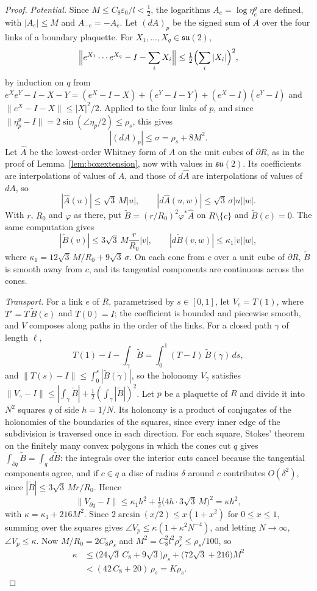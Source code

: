 \documentclass[11pt]{amsart}
\theoremstyle{definition}
\theoremstyle{remark}
\numberwithin{equation}{section}
\begin{document}
\begin{proof}
\emph{Potential.} Since $M\le C_8\varepsilon_0/l<\frac12$, the logarithms
$A_e=\log\eta^g_e$ are defined, with $|A_e|\le M$ and $A_{-e}=-A_e$. Let
$(dA)_p$ be the signed sum of $A$ over the four links of a boundary
plaquette. For $X_1,\dots,X_q\in\mathfrak{su}(2)$,
\[
\Bigl\lVert e^{X_1}\cdots e^{X_q}-I-\sum_iX_i\Bigr\rVert\le\tfrac12\Bigl(
\sum_i|X_i|\Bigr)^2 ,
\]
by induction on $q$ from $e^Xe^Y-I-X-Y=(e^X-I-X)+(e^Y-I-Y)+(e^X-I)(e^Y-I)$
and $\lVert e^X-I-X\rVert\le|X|^2/2$. Applied to the four links of $p$, and
since $\lVert\eta^g_p-I\rVert=2\sin(\angle\eta_p/2)\le\rho_s$, this gives
\[
|(dA)_p|\le\sigma=\rho_s+8M^2 .
\]
Let $\hat A$ be the lowest-order Whitney form of $A$ on the unit cubes of
$\partial R$, as in the proof of Lemma~\ref{lem:boxextension}, now with
values in $\mathfrak{su}(2)$. Its coefficients are interpolations of values
of $A$, and those of $d\hat A$ are interpolations of values of $dA$, so
\[
|\hat A(u)|\le\sqrt3\,M|u|,\qquad|d\hat A(u,w)|\le\sqrt3\,\sigma|u||w| .
\]
With $r$, $R_0$ and $\varphi$ as there, put $\tilde B=(r/R_0)^2\varphi^*
\hat A$ on $R\setminus\{c\}$ and $\tilde B(c)=0$. The same computation
gives
\[
|\tilde B(v)|\le3\sqrt3\,M\frac r{R_0}|v|,\qquad|d\tilde B(v,w)|\le\kappa_1
|v||w|,
\]
where $\kappa_1=12\sqrt3\,M/R_0+9\sqrt3\,\sigma$.
On each cone from $c$ over a unit cube of $\partial R$, $\tilde B$ is
smooth away from $c$, and its tangential components are continuous across
the cones.

\emph{Transport.} For a link $e$ of $R$, parametrised by $s\in[0,1]$, let
$V_e=T(1)$, where $T'=T\,\tilde B(\dot e)$ and $T(0)=I$; the coefficient is
bounded and piecewise smooth, and $V$ composes along paths in the order of
the links. For a closed path $\gamma$ of length $\ell$,
\[
T(1)-I-\int_\gamma\tilde B=\int_0^1(T-I)\,\tilde B(\dot\gamma)\,ds,
\]
and $\lVert T(s)-I\rVert\le\int_0^s|\tilde B(\dot\gamma)|$,
so the holonomy $V_\gamma$ satisfies $\lVert V_\gamma-I\rVert\le|\int_\gamma
\tilde B|+\frac12(\int_\gamma|\tilde B|)^2$. Let $p$ be a plaquette of $R$
and divide it into $N^2$ squares $q$ of side $h=1/N$. Its holonomy is a
product of conjugates of the holonomies of the boundaries of the squares,
since every inner edge of the subdivision is traversed once in each
direction. For each square, Stokes' theorem on the finitely many convex
polygons in which the cones cut $q$ gives $\int_{\partial q}\tilde B=
\int_qd\tilde B$: the integrals over the interior cuts cancel because the
tangential components agree, and if $c\in q$ a disc of radius $\delta$
around $c$ contributes $O(\delta^2)$, since $|\tilde B|\le3\sqrt3\,Mr/R_0$.
Hence
\[
\lVert V_{\partial q}-I\rVert\le\kappa_1h^2+\tfrac12\bigl(4h\cdot3\sqrt3\,M
\bigr)^2=\kappa h^2,
\]
with $\kappa=\kappa_1+216M^2$.
Since $2\arcsin(x/2)\le x(1+x^2)$ for $0\le x\le1$, summing over the
squares gives $\angle V_p\le\kappa(1+\kappa^2N^{-4})$, and letting
$N\to\infty$, $\angle V_p\le\kappa$. Now $M/R_0=2C_8\rho_s$ and
$M^2=C_8^2l^2\rho_s^2\le\rho_s/100$, so
\[
\begin{split}
\kappa&\le\bigl(24\sqrt3\,C_8+9\sqrt3\bigr)\rho_s+\bigl(72\sqrt3+216\bigr)M^2\\
&<(42\,C_8+20)\,\rho_s=K\rho_s .
\end{split}
\]


\end{proof}
\end{document}
